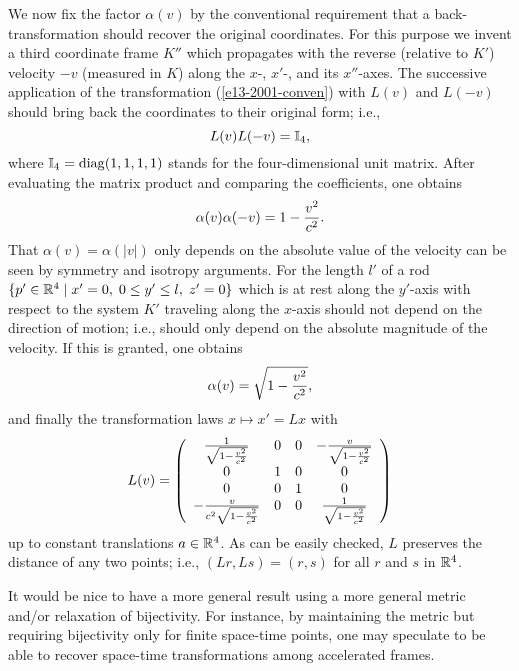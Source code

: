 We now fix the factor $\alpha (v)$ by the conventional requirement that
a back-transformation should recover the original coordinates.
For this purpose we invent a third coordinate frame $K''$ which
propagates with the reverse (relative to $K'$) velocity $-v$ (measured
in $K$) along the $x$-, $x'$-, and its $x''$-axes.
The successive application of the transformation
(\ref{e13-2001-conven}) with
$L(v)$ and $L(-v)$ should bring back the coordinates to their original
form; i.e.,
\begin{equation}
L(v)L(-v)={\Bbb I}_4,
\label{e14-2001-conven}
\end{equation}
where ${\Bbb I}_4={\rm diag}(1,1,1,1)$ stands for the four-dimensional
unit matrix.
After evaluating the matrix product and comparing the coefficients,
one obtains
\begin{equation}
\alpha (v)\alpha (-v) = 1-{v^2\over c^2}.
\label{e15-2001-conven}
\end{equation}
That
$\alpha (v)=\alpha (\vert v\vert )$
only depends on the absolute value of the velocity can be seen by
symmetry and isotropy arguments.
For the length $l'$ of a rod
$\{p'\in {\Bbb R}^4 \mid x'=0, \;0\le y'\le l,\; z'=0\}$
which is at rest along the $y'$-axis
with respect to the system $K'$ traveling along the $x$-axis
should not depend on the direction of motion; i.e., should only depend
on the absolute magnitude of the velocity.
If this is granted, one obtains
\begin{equation}
\alpha (v) = \sqrt{1-{v^2\over c^2}},
\label{e16-2001-conven}
\end{equation}
and finally the transformation laws
$x\mapsto x'=Lx$   with
\begin{equation}
L(v)=
\left(
\begin{array}{cccc}
{1\over  \sqrt{1-{v^2\over c^2}}}&0&0&-{v\over  \sqrt{1-{v^2\over c^2}}}\\
0&1&0&0\\
0&0&1&0\\
-{v\over c^2 \sqrt{1-{v^2\over c^2}}}&0&0&{1\over  \sqrt{1-{v^2\over
c^2}}}
\end{array}
\right)
\label{e17-2001-conven}
\end{equation}
up to constant translations $a\in {\Bbb R}^4$.
As can be easily checked, $L$ preserves the distance of any two points; i.e.,
$(Lr,Ls)=(r,s)$ for all $r$
and $s$ in ${\Bbb R}^4$.


It would be nice to have a more general result using a more general metric and/or
relaxation of bijectivity.
For instance, by maintaining the metric but requiring bijectivity only for finite
space-time points, one may speculate to be able to
recover space-time transformations among accelerated frames.

